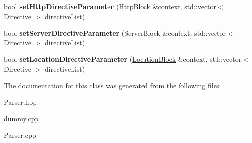 \begin{DoxyCompactItemize}
\item 
\mbox{\label{classft_1_1Parser_a22d4b8cbb9bcd4424327e096c40a5b73}} 
bool {\bfseries set\+Http\+Directive\+Parameter} (\hyperlink{classft_1_1HttpBlock}{Http\+Block} \&context, std\+::vector$<$ \hyperlink{classft_1_1Directive}{Directive} $>$ directive\+List)
\item 
\mbox{\label{classft_1_1Parser_ac535ec09504beb39c0517a9d86b97f0c}} 
bool {\bfseries set\+Server\+Directive\+Parameter} (\hyperlink{classft_1_1ServerBlock}{Server\+Block} \&context, std\+::vector$<$ \hyperlink{classft_1_1Directive}{Directive} $>$ directive\+List)
\item 
\mbox{\label{classft_1_1Parser_a80ab45c380a456bedb05fb22e65ea180}} 
bool {\bfseries set\+Location\+Directive\+Parameter} (\hyperlink{classft_1_1LocationBlock}{Location\+Block} \&context, std\+::vector$<$ \hyperlink{classft_1_1Directive}{Directive} $>$ directive\+List)
\end{DoxyCompactItemize}


The documentation for this class was generated from the following files\+:\begin{DoxyCompactItemize}
\item 
Parser.\+hpp\item 
dummy.\+cpp\item 
Parser.\+cpp\end{DoxyCompactItemize}
